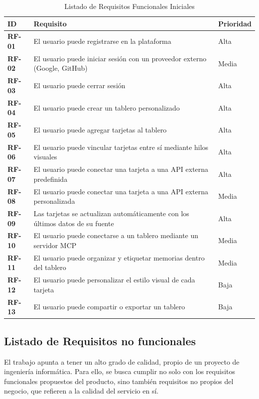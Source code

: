 \begin{table}[H]
  \centering
  \renewcommand{\arraystretch}{1.2}
  \begin{tabularx}{\textwidth}{>{\bfseries}l X l}
    \toprule
    ID & Requisito & Prioridad \\
    \midrule
    RF-01 & El usuario puede registrarse en la plataforma & Alta \\
    RF-02 & El usuario puede iniciar sesión con un proveedor externo (Google, GitHub) & Media \\
    RF-03 & El usuario puede cerrar sesión & Alta \\
    RF-04 & El usuario puede crear un tablero personalizado & Alta \\
    RF-05 & El usuario puede agregar tarjetas al tablero & Alta \\
    RF-06 & El usuario puede vincular tarjetas entre sí mediante hilos visuales & Alta \\
    RF-07 & El usuario puede conectar una tarjeta a una API externa predefinida & Alta \\
    RF-08 & El usuario puede conectar una tarjeta a una API externa personalizada & Media \\
    RF-09 & Las tarjetas se actualizan automáticamente con los últimos datos de su fuente & Alta \\
    RF-10 & El usuario puede conectarse a un tablero mediante un servidor MCP & Media \\
    RF-11 & El usuario puede organizar y etiquetar memorias dentro del tablero & Media \\
    RF-12 & El usuario puede personalizar el estilo visual de cada tarjeta & Baja \\
    RF-13 & El usuario puede compartir o exportar un tablero & Baja \\
    \bottomrule
  \end{tabularx}
  \caption{Listado de Requisitos Funcionales Iniciales}
  \label{tab:rf_iniciales}
\end{table}

\subsection{Listado de Requisitos no funcionales}
El trabajo apunta a tener un alto grado de calidad, propio de un proyecto de ingeniería informática. Para ello, se busca cumplir no solo con los requisitos funcionales propuestos del producto, sino también requisitos no propios del negocio, que refieren a la calidad del servicio en sí.

